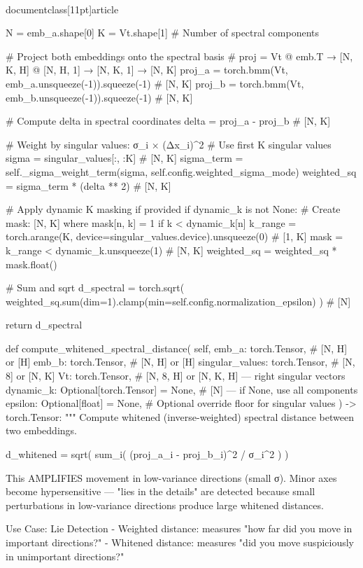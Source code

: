 \\documentclass[11pt]{article}
\begin{document}
\begin{CodeBlock}
        N = emb_a.shape[0]
        K = Vt.shape[1]  # Number of spectral components

        # Project both embeddings onto the spectral basis
        # proj = Vt @ emb.T → [N, K, H] @ [N, H, 1] → [N, K, 1] → [N, K]
        proj_a = torch.bmm(Vt, emb_a.unsqueeze(-1)).squeeze(-1)  # [N, K]
        proj_b = torch.bmm(Vt, emb_b.unsqueeze(-1)).squeeze(-1)  # [N, K]

        # Compute delta in spectral coordinates
        delta = proj_a - proj_b  # [N, K]

        # Weight by singular values: σ_i × (Δx_i)^2
        # Use first K singular values
        sigma = singular_values[:, :K]  # [N, K]
        sigma_term = self._sigma_weight_term(sigma, self.config.weighted_sigma_mode)
        weighted_sq = sigma_term * (delta ** 2)  # [N, K]

        # Apply dynamic K masking if provided
        if dynamic_k is not None:
            # Create mask: [N, K] where mask[n, k] = 1 if k < dynamic_k[n]
            k_range = torch.arange(K, device=singular_values.device).unsqueeze(0)  # [1, K]
            mask = k_range < dynamic_k.unsqueeze(1)  # [N, K]
            weighted_sq = weighted_sq * mask.float()

        # Sum and sqrt
        d_spectral = torch.sqrt(
            weighted_sq.sum(dim=1).clamp(min=self.config.normalization_epsilon)
        )  # [N]

        return d_spectral

    def compute_whitened_spectral_distance(
        self,
        emb_a: torch.Tensor,  # [N, H] or [H]
        emb_b: torch.Tensor,  # [N, H] or [H]
        singular_values: torch.Tensor,  # [N, 8] or [N, K]
        Vt: torch.Tensor,  # [N, 8, H] or [N, K, H] — right singular vectors
        dynamic_k: Optional[torch.Tensor] = None,  # [N] — if None, use all components
        epsilon: Optional[float] = None,  # Optional override floor for singular values
    ) -> torch.Tensor:
        """
        Compute whitened (inverse-weighted) spectral distance between two embeddings.

        d_whitened = sqrt( sum_i( (proj_a_i - proj_b_i)^2 / σ_i^2 ) )

        This AMPLIFIES movement in low-variance directions (small σ). Minor axes
        become hypersensitive — "lies in the details" are detected because small
        perturbations in low-variance directions produce large whitened distances.

        Use Case: Lie Detection
        - Weighted distance: measures "how far did you move in important directions?"
        - Whitened distance: measures "did you move suspiciously in unimportant directions?"


\end{CodeBlock}
\end{document}
